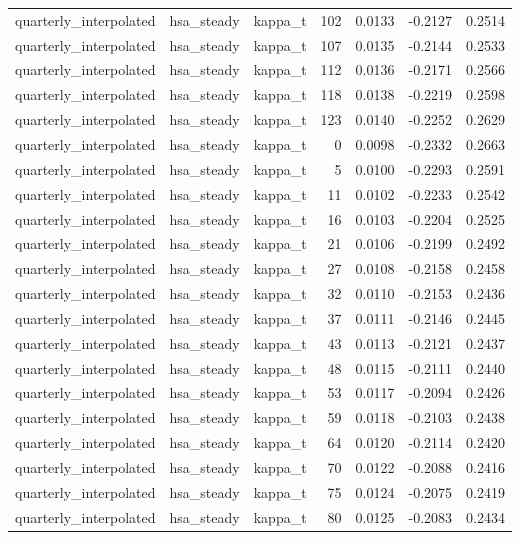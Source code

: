 \begin{tabular}{lllrrrr}
quarterly\_interpolated & hsa\_steady & kappa\_t & 102 & 0.0133 & -0.2127 & 0.2514 \\
quarterly\_interpolated & hsa\_steady & kappa\_t & 107 & 0.0135 & -0.2144 & 0.2533 \\
quarterly\_interpolated & hsa\_steady & kappa\_t & 112 & 0.0136 & -0.2171 & 0.2566 \\
quarterly\_interpolated & hsa\_steady & kappa\_t & 118 & 0.0138 & -0.2219 & 0.2598 \\
quarterly\_interpolated & hsa\_steady & kappa\_t & 123 & 0.0140 & -0.2252 & 0.2629 \\
quarterly\_interpolated & hsa\_steady & kappa\_t & 0 & 0.0098 & -0.2332 & 0.2663 \\
quarterly\_interpolated & hsa\_steady & kappa\_t & 5 & 0.0100 & -0.2293 & 0.2591 \\
quarterly\_interpolated & hsa\_steady & kappa\_t & 11 & 0.0102 & -0.2233 & 0.2542 \\
quarterly\_interpolated & hsa\_steady & kappa\_t & 16 & 0.0103 & -0.2204 & 0.2525 \\
quarterly\_interpolated & hsa\_steady & kappa\_t & 21 & 0.0106 & -0.2199 & 0.2492 \\
quarterly\_interpolated & hsa\_steady & kappa\_t & 27 & 0.0108 & -0.2158 & 0.2458 \\
quarterly\_interpolated & hsa\_steady & kappa\_t & 32 & 0.0110 & -0.2153 & 0.2436 \\
quarterly\_interpolated & hsa\_steady & kappa\_t & 37 & 0.0111 & -0.2146 & 0.2445 \\
quarterly\_interpolated & hsa\_steady & kappa\_t & 43 & 0.0113 & -0.2121 & 0.2437 \\
quarterly\_interpolated & hsa\_steady & kappa\_t & 48 & 0.0115 & -0.2111 & 0.2440 \\
quarterly\_interpolated & hsa\_steady & kappa\_t & 53 & 0.0117 & -0.2094 & 0.2426 \\
quarterly\_interpolated & hsa\_steady & kappa\_t & 59 & 0.0118 & -0.2103 & 0.2438 \\
quarterly\_interpolated & hsa\_steady & kappa\_t & 64 & 0.0120 & -0.2114 & 0.2420 \\
quarterly\_interpolated & hsa\_steady & kappa\_t & 70 & 0.0122 & -0.2088 & 0.2416 \\
quarterly\_interpolated & hsa\_steady & kappa\_t & 75 & 0.0124 & -0.2075 & 0.2419 \\
quarterly\_interpolated & hsa\_steady & kappa\_t & 80 & 0.0125 & -0.2083 & 0.2434 \\

\end{tabular}
